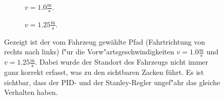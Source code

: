 \documentclass[arbeit=studie,oneside,BCOR=12mm]{ArbeitRST}
\begin{document}
\begin{figure}[h]
    \begin{subfigure}{0.5\textwidth}
        \centering
        \caption{$v = 1.0 \frac{\mathrm{m}}{\mathrm{s}}$.}
        \label{ab:1.0}
    \end{subfigure}
    \begin{subfigure}{0.5\textwidth}
        \centering
        \caption{$v = 1.25 \frac{\mathrm{m}}{\mathrm{s}}$.}
        \label{ab:1.25}
    \end{subfigure}
    \caption{Gezeigt ist der vom Fahrzeug gewählte Pfad (Fahrtrichtung von
    rechts nach links) f"ur die Vorw"artsgeschwindigkeiten $v = 1.0
    \frac{\mathrm{m}}{\mathrm{s}}$ und $v = 1.25
    \frac{\mathrm{m}}{\mathrm{s}}$. Dabei wurde der Standort des Fahrzeugs
    nicht immer ganz korrekt erfasst, was zu den sichtbaren Zacken
    führt. Es ist sichtbar, dass der PID- und der Stanley-Regler ungef"ahr
    das gleiche Verhalten haben.}
\end{figure}
\end{document}

